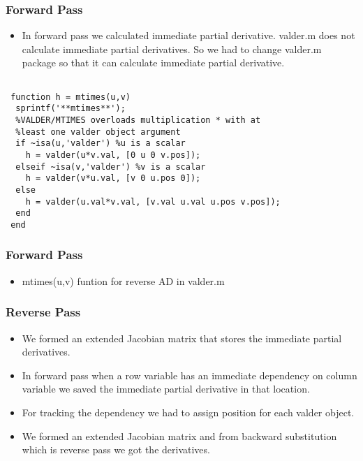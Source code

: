 \documentclass[10pt]{beamer}
\begin{document}
\begin{frame}
\frametitle{Forward Pass}
\begin{itemize}
\item In forward pass  we calculated immediate partial derivative. valder.m does not calculate immediate partial derivatives. So we had to change valder.m package so that it can calculate immediate partial derivative.

  \usebox{\codebox}
 
\end{itemize}
\end{frame}

\begin{lrbox}{\codebox}
\begin{lstlisting}

 function h = mtimes(u,v)
  sprintf('**mtimes**');
  %VALDER/MTIMES overloads multiplication * with at  
  %least one valder object argument 
  if ~isa(u,'valder') %u is a scalar
 	h = valder(u*v.val, [0 u 0 v.pos]);
  elseif ~isa(v,'valder') %v is a scalar
    h = valder(v*u.val, [v 0 u.pos 0]);
  else
    h = valder(u.val*v.val, [v.val u.val u.pos v.pos]);
  end
 end 
\end{lstlisting}
\end{lrbox}

\begin{frame}
\frametitle{Forward Pass}
\begin{itemize}
\item mtimes(u,v) funtion for reverse AD in valder.m

  \usebox{\codebox}
 
\end{itemize}
\end{frame}
\begin{frame}
\frametitle{Reverse Pass}
\begin{itemize}
\item We formed an extended Jacobian matrix that stores the immediate partial derivatives.
\item In forward pass when a row variable has an immediate dependency on column variable we saved the immediate partial derivative in that location.
\item For tracking the dependency we had to assign position for each valder object.
\item We formed an extended Jacobian matrix and from backward substitution which is reverse pass we got the derivatives. 
\end{itemize}
\end{frame}



\begin{frame}
\Large
\begin{center}
\end{center}
\end{frame}
\end{document}
